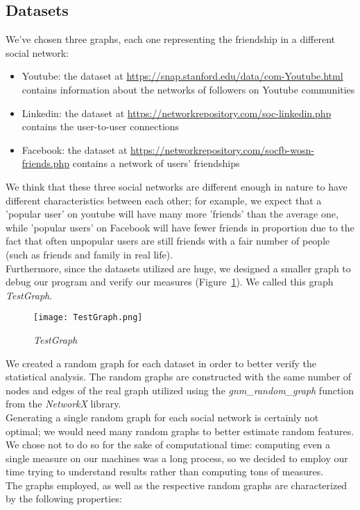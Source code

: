 \documentclass{article}
\begin{document}
\subsection{Datasets}
We’ve chosen three graphs, each one representing the friendship in a different social network:
\begin{itemize}
    \item Youtube: the dataset at \url{https://snap.stanford.edu/data/com-Youtube.html} contains information about the networks of followers on Youtube communities 
    \item Linkedin: the dataset at \url{https://networkrepository.com/soc-linkedin.php} contains the user-to-user connections
    \item Facebook: the dataset at \url{https://networkrepository.com/socfb-wosn-friends.php} contains a network of users' friendships
\end{itemize}
We think that these three social networks are different enough in nature to have different characteristics between each other; for example, we expect that a 'popular user' on youtube will have many more 'friends' than the average one, while 'popular users' on Facebook will have fewer friends in proportion due to the fact that often unpopular users are still friends with a fair number of people (such as friends and family in real life).\\
Furthermore, since the datasets utilized are huge, we designed a smaller graph to debug our program and verify our measures (Figure~\ref{fig:testgraph}). We called this graph \textit{TestGraph}.
\begin{figure}[H]
    \centering
    \texttt{[image: TestGraph.png]}
    \caption{\textit{TestGraph}}
    \label{fig:testgraph}
\end{figure}
We created a random graph for each dataset in order to better verify the statistical analysis. The random graphs are constructed with the same number of nodes and edges of the real graph utilized using the \textit{gnm\_random\_graph} function from the \textit{NetworkX} library.\\
Generating a single random graph for each social network is certainly not optimal; we would need many random graphs to better estimate random features. We chose not to do so for the sake of computational time: computing even a single measure on our machines was a long process, so we decided to employ our time trying to understand results rather than computing tons of measures.\\
The graphs employed, as well as the respective random graphs are characterized by the following properties:
\end{document}
